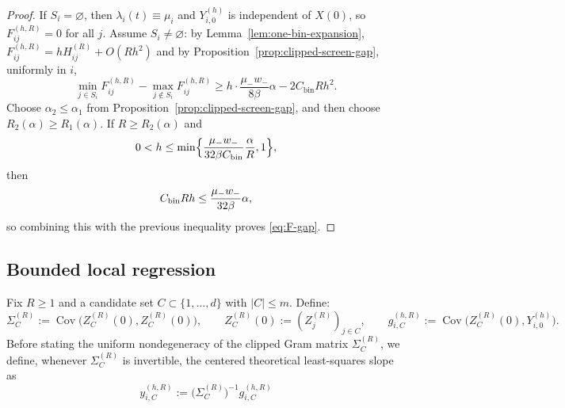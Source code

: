 \documentclass{article}
\newcommand{\Cov}{\operatorname{Cov}}
\begin{document}
\begin{proof}
If $S_i=\varnothing$, then $\lambda_i(t)\equiv \mu_i$ and $Y_{i,0}^{(h)}$ is independent of $X(0)$, so $F_{ij}^{(h,R)}=0$ for all $j$.
Assume $S_i\neq\varnothing$: by Lemma~\ref{lem:one-bin-expansion}, $F_{ij}^{(h,R)} = hH_{ij}^{(R)} + O(Rh^2)$ and by Proposition~\ref{prop:clipped-screen-gap}, uniformly in $i$,
\[
\min_{j\in S_i}F_{ij}^{(h,R)}
-\max_{j\notin S_i}F_{ij}^{(h,R)}
\ge h\cdot \frac{\mu_-w_-}{8\beta}\alpha - 2C_{\text{bin}} R h^2.
\]
Choose $\alpha_2\le \alpha_1$ from Proposition~\ref{prop:clipped-screen-gap}, and then choose $R_2(\alpha)\ge R_1(\alpha)$. If $R\ge R_2(\alpha)$ and
\[
0<h\le \min\Bigl\{\frac{\mu_-w_-}{32\beta C_{\rm bin}}\frac{\alpha}{R}, 1\Bigr\},
\]
then
\[
C_{\rm bin}Rh\le \frac{\mu_-w_-}{32\beta}\alpha,
\]
so combining this with the previous inequality proves \eqref{eq:F-gap}.
\end{proof}


\subsection{Bounded local regression}
\label{appendix:3}
Fix $R\ge 1$ and a candidate set $C\subset\{1,\dots,d\}$ with $|C|\le m$. Define:
\[
\Sigma_C^{(R)}:=\Cov\bigl(Z_C^{(R)}(0),Z_C^{(R)}(0)\bigr),
\qquad
Z_C^{(R)}(0):=(Z_j^{(R)})_{j\in C}, \qquad g_{i,C}^{(h,R)}:=\Cov\bigl(Z_C^{(R)}(0),Y_{i,0}^{(h)}\bigr).
\]
Before stating the uniform nondegeneracy of the clipped Gram matrix $\Sigma_C^{(R)}$, we define, whenever $\Sigma_C^{(R)}$ is invertible, the centered theoretical least-squares slope as
\begin{equation}
\label{eq:population-slope}
y_{i,C}^{(h,R)}:=\bigl(\Sigma_C^{(R)}\bigr)^{-1}g_{i,C}^{(h,R)}
\end{equation}
\end{document}
